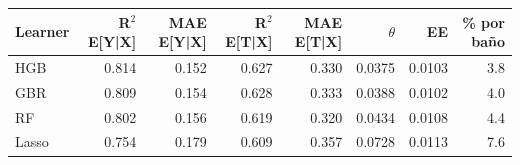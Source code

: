 \begin{tabular}{lrrrrrrr}
\toprule
Learner & R$^2$ E[Y|X] & MAE E[Y|X] & R$^2$ E[T|X] & MAE E[T|X] & $\theta$ & EE & \% por baño \\
\midrule
HGB & 0.814 & 0.152 & 0.627 & 0.330 & 0.0375 & 0.0103 & 3.8 \\
GBR & 0.809 & 0.154 & 0.628 & 0.333 & 0.0388 & 0.0102 & 4.0 \\
RF & 0.802 & 0.156 & 0.619 & 0.320 & 0.0434 & 0.0108 & 4.4 \\
Lasso & 0.754 & 0.179 & 0.609 & 0.357 & 0.0728 & 0.0113 & 7.6 \\
\bottomrule
\end{tabular}